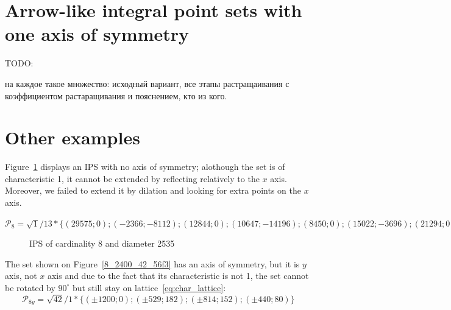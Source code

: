 \documentclass[12pt]{article}
\theoremstyle{theorem}
\theoremstyle{dfn}
\theoremstyle{remark}
\begin{document}
\section{Arrow-like integral point sets with one axis of symmetry}

TODO:

на каждое такое множество: исходный вариант, все этапы растращаивания с коэффициентом растаращивания и пояснением, кто из кого.


\section{Other examples}

Figure~\ref{8_2535_1_d680} displays an IPS with
no axis of symmetry;
alothough the set is of characteristic 1,
it cannot be extended by reflecting relatively to the $x$ axis.
Moreover, we failed to extend it by dilation and looking for extra points on the $x$ axis.


$\mathcal{P}_8=
\sqrt{1}/13*
\{
( 29575 ; 0);
( -2366 ; -8112);
( 12844 ; 0);
( 10647 ; -14196);
( 8450 ; 0);
( 15022 ; -3696);
( 21294 ; 0);
( 0 ; 0);
\}
$

\begin{figure}[h!]
\parbox{1\linewidth}{\caption{IPS of cardinality 8 and diameter 2535}
\label{8_2535_1_d680}}
\end{figure}

The set shown on Figure~\ref{8_2400_42_56f3} has an axis of symmetry, but it is $y$ axis, not $x$ axis
and due to the fact that its characteristic is not 1,
the set cannot be rotated by $90^\circ$ but still stay on lattice~\eqref{eq:char_lattice}:
\begin{equation}
	\mathcal{P}_{8y}=
	\sqrt{42}/1*\{( \pm1200 ; 0);
	( \pm529 ; 182);
	( \pm814 ; 152);
	( \pm440 ; 80)
	\}
\end{equation}
\end{document}
